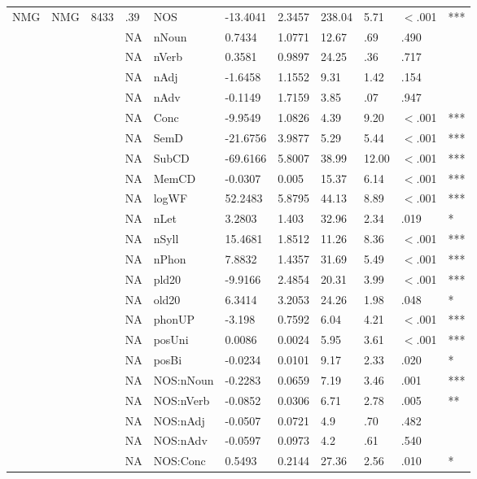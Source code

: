\begin{table}[ht]
\begin{tabular}{lllllllllll}
  NMG & NMG & 8433 & .39 & NOS & -13.4041 & 2.3457 & 238.04 & 5.71 & $<$.001 & *** \\ 
   &  &  & NA & nNoun & 0.7434 & 1.0771 & 12.67 & .69 & .490 &   \\ 
   &  &  & NA & nVerb & 0.3581 & 0.9897 & 24.25 & .36 & .717 &   \\ 
   &  &  & NA & nAdj & -1.6458 & 1.1552 & 9.31 & 1.42 & .154 &   \\ 
   &  &  & NA & nAdv & -0.1149 & 1.7159 & 3.85 & .07 & .947 &   \\ 
   &  &  & NA & Conc & -9.9549 & 1.0826 & 4.39 & 9.20 & $<$.001 & *** \\ 
   &  &  & NA & SemD & -21.6756 & 3.9877 & 5.29 & 5.44 & $<$.001 & *** \\ 
   &  &  & NA & SubCD & -69.6166 & 5.8007 & 38.99 & 12.00 & $<$.001 & *** \\ 
   &  &  & NA & MemCD & -0.0307 & 0.005 & 15.37 & 6.14 & $<$.001 & *** \\ 
   &  &  & NA & logWF & 52.2483 & 5.8795 & 44.13 & 8.89 & $<$.001 & *** \\ 
   &  &  & NA & nLet & 3.2803 & 1.403 & 32.96 & 2.34 & .019 & * \\ 
   &  &  & NA & nSyll & 15.4681 & 1.8512 & 11.26 & 8.36 & $<$.001 & *** \\ 
   &  &  & NA & nPhon & 7.8832 & 1.4357 & 31.69 & 5.49 & $<$.001 & *** \\ 
   &  &  & NA & pld20 & -9.9166 & 2.4854 & 20.31 & 3.99 & $<$.001 & *** \\ 
   &  &  & NA & old20 & 6.3414 & 3.2053 & 24.26 & 1.98 & .048 & * \\ 
   &  &  & NA & phonUP & -3.198 & 0.7592 & 6.04 & 4.21 & $<$.001 & *** \\ 
   &  &  & NA & posUni & 0.0086 & 0.0024 & 5.95 & 3.61 & $<$.001 & *** \\ 
   &  &  & NA & posBi & -0.0234 & 0.0101 & 9.17 & 2.33 & .020 & * \\ 
   &  &  & NA & NOS:nNoun & -0.2283 & 0.0659 & 7.19 & 3.46 & .001 & *** \\ 
   &  &  & NA & NOS:nVerb & -0.0852 & 0.0306 & 6.71 & 2.78 & .005 & ** \\ 
   &  &  & NA & NOS:nAdj & -0.0507 & 0.0721 & 4.9 & .70 & .482 &   \\ 
   &  &  & NA & NOS:nAdv & -0.0597 & 0.0973 & 4.2 & .61 & .540 &   \\ 
   &  &  & NA & NOS:Conc & 0.5493 & 0.2144 & 27.36 & 2.56 & .010 & * \\ 

\end{tabular}
\end{table}
